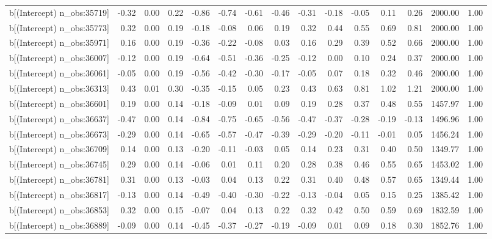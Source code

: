 \begin{table}[ht]
\begin{tabular}{rrrrrrrrrrrrrrr}
  b[(Intercept) n\_obs:35719] & -0.32 & 0.00 & 0.22 & -0.86 & -0.74 & -0.61 & -0.46 & -0.31 & -0.18 & -0.05 & 0.11 & 0.26 & 2000.00 & 1.00 \\ 
  b[(Intercept) n\_obs:35773] & 0.32 & 0.00 & 0.19 & -0.18 & -0.08 & 0.06 & 0.19 & 0.32 & 0.44 & 0.55 & 0.69 & 0.81 & 2000.00 & 1.00 \\ 
  b[(Intercept) n\_obs:35971] & 0.16 & 0.00 & 0.19 & -0.36 & -0.22 & -0.08 & 0.03 & 0.16 & 0.29 & 0.39 & 0.52 & 0.66 & 2000.00 & 1.00 \\ 
  b[(Intercept) n\_obs:36007] & -0.12 & 0.00 & 0.19 & -0.64 & -0.51 & -0.36 & -0.25 & -0.12 & 0.00 & 0.10 & 0.24 & 0.37 & 2000.00 & 1.00 \\ 
  b[(Intercept) n\_obs:36061] & -0.05 & 0.00 & 0.19 & -0.56 & -0.42 & -0.30 & -0.17 & -0.05 & 0.07 & 0.18 & 0.32 & 0.46 & 2000.00 & 1.00 \\ 
  b[(Intercept) n\_obs:36313] & 0.43 & 0.01 & 0.30 & -0.35 & -0.15 & 0.05 & 0.23 & 0.43 & 0.63 & 0.81 & 1.02 & 1.21 & 2000.00 & 1.00 \\ 
  b[(Intercept) n\_obs:36601] & 0.19 & 0.00 & 0.14 & -0.18 & -0.09 & 0.01 & 0.09 & 0.19 & 0.28 & 0.37 & 0.48 & 0.55 & 1457.97 & 1.00 \\ 
  b[(Intercept) n\_obs:36637] & -0.47 & 0.00 & 0.14 & -0.84 & -0.75 & -0.65 & -0.56 & -0.47 & -0.37 & -0.28 & -0.19 & -0.13 & 1496.96 & 1.00 \\ 
  b[(Intercept) n\_obs:36673] & -0.29 & 0.00 & 0.14 & -0.65 & -0.57 & -0.47 & -0.39 & -0.29 & -0.20 & -0.11 & -0.01 & 0.05 & 1456.24 & 1.00 \\ 
  b[(Intercept) n\_obs:36709] & 0.14 & 0.00 & 0.13 & -0.20 & -0.11 & -0.03 & 0.05 & 0.14 & 0.23 & 0.31 & 0.40 & 0.50 & 1349.77 & 1.00 \\ 
  b[(Intercept) n\_obs:36745] & 0.29 & 0.00 & 0.14 & -0.06 & 0.01 & 0.11 & 0.20 & 0.28 & 0.38 & 0.46 & 0.55 & 0.65 & 1453.02 & 1.00 \\ 
  b[(Intercept) n\_obs:36781] & 0.31 & 0.00 & 0.13 & -0.03 & 0.04 & 0.13 & 0.22 & 0.31 & 0.40 & 0.48 & 0.57 & 0.65 & 1349.44 & 1.00 \\ 
  b[(Intercept) n\_obs:36817] & -0.13 & 0.00 & 0.14 & -0.49 & -0.40 & -0.30 & -0.22 & -0.13 & -0.04 & 0.05 & 0.15 & 0.25 & 1385.42 & 1.00 \\ 
  b[(Intercept) n\_obs:36853] & 0.32 & 0.00 & 0.15 & -0.07 & 0.04 & 0.13 & 0.22 & 0.32 & 0.42 & 0.50 & 0.59 & 0.69 & 1832.59 & 1.00 \\ 
  b[(Intercept) n\_obs:36889] & -0.09 & 0.00 & 0.14 & -0.45 & -0.37 & -0.27 & -0.19 & -0.09 & 0.01 & 0.09 & 0.18 & 0.30 & 1852.76 & 1.00 \\ 

\end{tabular}
\end{table}
